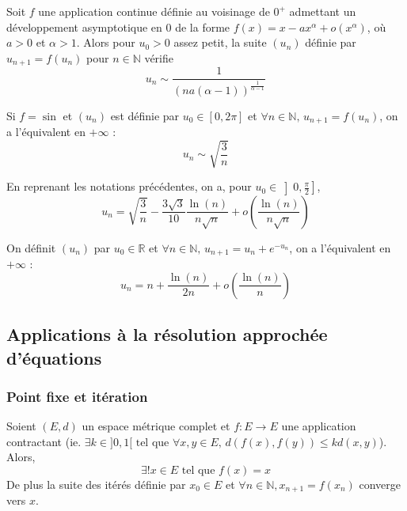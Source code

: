	
	\begin{proposition}
		Soit $f$ une application continue définie au voisinage de $0^+$ admettant
		un développement asymptotique en $0$ de la forme $f(x) = x - ax^\alpha + o(x^\alpha)$, où $a > 0$ et $\alpha > 1$. Alors pour $u_0 > 0$ assez petit, la suite $(u_n)$ définie par $u_{n+1} = f(u_n)$ pour $n \in \mathbb{N}$ vérifie
		\[ u_n \sim \frac{1}{(na(\alpha-1))^{\frac{1}{\alpha-1}}} \]
	\end{proposition}
	
	\begin{example}
		Si $f = \sin$ et $(u_n)$ est définie par $u_0 \in [0, 2\pi]$ et $\forall n \in \mathbb{N}, \, u_{n+1} = f(u_n)$, on a l'équivalent en $+\infty$ :
		\[ u_n \sim \sqrt{\frac{3}{n}} \]
	\end{example}
	
	
	\begin{proposition}
		En reprenant les notations précédentes, on a, pour $u_0 \in \left] 0, \frac{\pi}{2} \right]$,
		\[ u_n = \sqrt{\frac{3}{n}} - \frac{3 \sqrt{3}}{10} \frac{\ln(n)}{n\sqrt{n}} + o\left( \frac{\ln(n)}{n\sqrt{n}} \right) \]
	\end{proposition}
	
	
	\begin{example}
		On définit $(u_n)$ par $u_0 \in \mathbb{R}$ et $\forall n \in \mathbb{N}, \, u_{n+1} = u_n + e^{-u_n}$, on a l'équivalent en $+\infty$ :
		\[ u_n = n + \frac{\ln(n)}{2n} + o\left( \frac{\ln(n)}{n} \right) \]
	\end{example}
	
	\subsection{Applications à la résolution approchée d'équations}
	
	\subsubsection{Point fixe et itération}
	
	
	\begin{theorem}
		Soient $(E,d)$ un espace métrique complet et $f : E \rightarrow E$ une application contractant (ie. $\exists k \in ]0,1[ \text{ tel que } \forall x, y \in E, \, d(f(x), f(y)) \leq k d(x, y)$). Alors,
		\[ \exists! x \in E \text{ tel que } f(x) = x \]
		De plus la suite des itérés définie par $x_0 \in E$ et $\forall n \in \mathbb{N}, x_{n+1} = f(x_n)$ converge vers $x$.
	\end{theorem}
	
